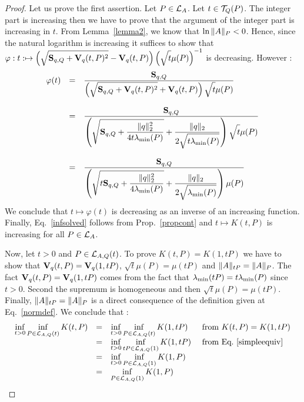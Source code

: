 \documentclass[10pt]{llncs}
\begin{document}
\begin{proof}
Let us prove the first assertion.
Let $P\in\mathcal{L}_{A}$. Let $t\in\mathcal{T}_{Q}(P)$. The integer part is increasing then we have to prove that the argument of the integer part is increasing in $t$. From Lemma~\ref{lemma2}, we know that $\ln{\| A\|_P}<0$. Hence, since the natural logarithm is increasing it suffices to show that $\varphi:t:\mapsto \left(\sqrt{\strut \mathbf{S}_{q,Q}+\mathbf{V}_{q}(t,P)^2}-\mathbf{V}_{q}(t,P)\right)\left(\sqrt{\strut t}\mu(P)\right)^{-1}$ is decreasing. However :
\[
\begin{array}{lll}
\varphi(t)&=&\dfrac{\mathbf{S}_{q,Q}}{\left(\sqrt{\strut \mathbf{S}_{q,Q}+\mathbf{V}_{q}(t,P)^2}+\mathbf{V}_{q}(t,P)\right)\sqrt{\strut t}\mu(P)}\\
\\
&=&\dfrac{\mathbf{S}_{q,Q}}{\left(\sqrt{\strut \mathbf{S}_{q,Q}+\dfrac{\| q\|_2^2 }{4t\lambda_{\operatorname{min}}(P)}}+\dfrac{\| q\|_2 }{2\sqrt{\strut t\lambda_{\operatorname{min}}(P)}}\right)\sqrt{\strut t}\mu(P)}\\
\\
&=&\dfrac{\mathbf{S}_{q,Q}}{\left(\sqrt{\strut t\mathbf{S}_{q,Q}+\dfrac{\| q\|_2^2 }{4\lambda_{\operatorname{min}}(P)}}+\dfrac{\| q\|_2 }{2\sqrt{\strut \lambda_{\operatorname{min}}(P)}}\right)\mu(P)}
\end{array}
\]
We conclude that $t\mapsto \varphi(t)$ is decreasing as an inverse of an increasing function. 
Finally, Eq.~\eqref{infsolved} follows from Prop.~\ref{propcont} and $t\mapsto K(t,P)$ is increasing for all $P\in\mathcal{L}_{A}$.  

Now, let $t>0$ and $P\in\mathcal{L}_{A,Q}(t)$. To prove $K(t,P)=K(1,tP)$ we have to show that $\mathbf{V}_{q}(t,P)=\mathbf{V}_{q}(1,tP)$, $\sqrt{t}\mu(P)=\mu(tP)$
and $\| A\|_{tP}=\| A\|_P$. The fact $\mathbf{V}_{q}(t,P)=\mathbf{V}_{q}(1,tP)$ comes from the fact that $\lambda_{\operatorname{min}}(tP)=t\lambda_{\operatorname{min}}(P)$ since $t>0$. Second the supremum is homogeneous and then $\sqrt{t}\mu(P)=\mu(tP)$. Finally, $\| A\|_{tP}=\| A\|_P$ is a direct consequence of the definition given at Eq.~\eqref{normdef}. We conclude that :
\[
\begin{array}{llll}
\displaystyle{\inf_{t>0} \inf_{P\in\mathcal{L}_{A,Q}(t)} K(t,P)}&=&\displaystyle{\inf_{t>0} \inf_{P\in\mathcal{L}_{A,Q}(t)} K(1,tP)}& \text{ from } K(t,P)=K(1,tP)\\
&=&\displaystyle{\inf_{t>0} \inf_{tP\in\mathcal{L}_{A,Q}(1)} K(1,tP)}&\text{ from Eq.~\eqref{simpleequiv}} \\ 
&=&\displaystyle{\inf_{t>0} \inf_{P\in\mathcal{L}_{A,Q}(1)} K(1,P)}&\\
&=&\displaystyle{\inf_{P\in\mathcal{L}_{A,Q}(1)} K(1,P)}&
\end{array}
\]
\end{proof}
\end{document}
